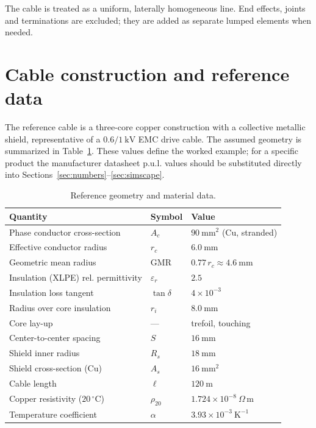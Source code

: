 \documentclass[11pt,a4paper]{article}
\begin{document}
The cable is treated as a uniform, laterally homogeneous line. End effects,
joints and terminations are excluded; they are added as separate lumped elements
when needed.

\section{Cable construction and reference data}
The reference cable is a three-core copper construction with a collective metallic
shield, representative of a $0.6/1\ \mathrm{kV}$ EMC drive cable. The assumed
geometry is summarized in Table~\ref{tab:geom}. These values define the worked
example; for a specific product the manufacturer datasheet p.u.l. values should be
substituted directly into Sections~\ref{sec:numbers}--\ref{sec:simscape}.

\begin{table}[h]
\centering
\caption{Reference geometry and material data.}
\label{tab:geom}
\begin{tabular}{@{}lll@{}}
\toprule
Quantity & Symbol & Value \\
\midrule
Phase conductor cross-section & $A_c$ & $90\ \mathrm{mm^2}$ (Cu, stranded) \\
Effective conductor radius & $r_c$ & $6.0\ \mathrm{mm}$ \\
Geometric mean radius & $\mathrm{GMR}$ & $0.77\,r_c \approx 4.6\ \mathrm{mm}$ \\
Insulation (XLPE) rel. permittivity & $\varepsilon_r$ & $2.5$ \\
Insulation loss tangent & $\tan\delta$ & $4\times10^{-3}$ \\
Radius over core insulation & $r_i$ & $8.0\ \mathrm{mm}$ \\
Core lay-up & --- & trefoil, touching \\
Center-to-center spacing & $S$ & $16\ \mathrm{mm}$ \\
Shield inner radius & $R_s$ & $18\ \mathrm{mm}$ \\
Shield cross-section (Cu) & $A_s$ & $16\ \mathrm{mm^2}$ \\
Cable length & $\ell$ & $120\ \mathrm{m}$ \\
Copper resistivity ($20\,^\circ\mathrm{C}$) & $\rho_{20}$ & $1.724\times10^{-8}\ \Omega\,\mathrm{m}$ \\
Temperature coefficient & $\alpha$ & $3.93\times10^{-3}\ \mathrm{K^{-1}}$ \\
\bottomrule
\end{tabular}
\end{table}
\end{document}
